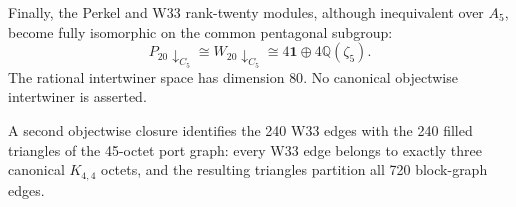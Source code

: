 Finally, the Perkel and W33 rank-twenty modules, although inequivalent over
$A_5$, become fully isomorphic on the common pentagonal subgroup:
\[
P_{20}\downarrow_{C_5}\cong W_{20}\downarrow_{C_5}
\cong4\mathbf1\oplus4\mathbb Q(\zeta_5).
\]
The rational intertwiner space has dimension $80$.  No canonical objectwise
intertwiner is asserted.

A second objectwise closure identifies the 240 W33 edges with the 240 filled
triangles of the 45-octet port graph: every W33 edge belongs to exactly three
canonical $K_{4,4}$ octets, and the resulting triangles partition all 720
block-graph edges.

